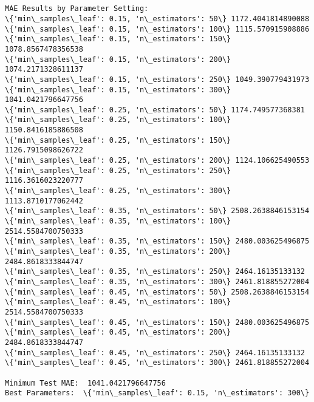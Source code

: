 \documentclass[11pt]{article}
\begin{document}
    \begin{center}
    \end{center}
    { \hspace*{\fill} \\}
    
    \begin{Verbatim}[commandchars=\\\{\}]

MAE Results by Parameter Setting:
\{'min\_samples\_leaf': 0.15, 'n\_estimators': 50\} 1172.4041814890088
\{'min\_samples\_leaf': 0.15, 'n\_estimators': 100\} 1115.570915908886
\{'min\_samples\_leaf': 0.15, 'n\_estimators': 150\} 1078.8567478356538
\{'min\_samples\_leaf': 0.15, 'n\_estimators': 200\} 1074.2171328611137
\{'min\_samples\_leaf': 0.15, 'n\_estimators': 250\} 1049.390779431973
\{'min\_samples\_leaf': 0.15, 'n\_estimators': 300\} 1041.0421796647756
\{'min\_samples\_leaf': 0.25, 'n\_estimators': 50\} 1174.749577368381
\{'min\_samples\_leaf': 0.25, 'n\_estimators': 100\} 1150.8416185886508
\{'min\_samples\_leaf': 0.25, 'n\_estimators': 150\} 1126.7915098626722
\{'min\_samples\_leaf': 0.25, 'n\_estimators': 200\} 1124.106625490553
\{'min\_samples\_leaf': 0.25, 'n\_estimators': 250\} 1116.3616023220777
\{'min\_samples\_leaf': 0.25, 'n\_estimators': 300\} 1113.8710177062442
\{'min\_samples\_leaf': 0.35, 'n\_estimators': 50\} 2508.2638846153154
\{'min\_samples\_leaf': 0.35, 'n\_estimators': 100\} 2514.5584700750333
\{'min\_samples\_leaf': 0.35, 'n\_estimators': 150\} 2480.003625496875
\{'min\_samples\_leaf': 0.35, 'n\_estimators': 200\} 2484.8618333844747
\{'min\_samples\_leaf': 0.35, 'n\_estimators': 250\} 2464.16135133132
\{'min\_samples\_leaf': 0.35, 'n\_estimators': 300\} 2461.818855272004
\{'min\_samples\_leaf': 0.45, 'n\_estimators': 50\} 2508.2638846153154
\{'min\_samples\_leaf': 0.45, 'n\_estimators': 100\} 2514.5584700750333
\{'min\_samples\_leaf': 0.45, 'n\_estimators': 150\} 2480.003625496875
\{'min\_samples\_leaf': 0.45, 'n\_estimators': 200\} 2484.8618333844747
\{'min\_samples\_leaf': 0.45, 'n\_estimators': 250\} 2464.16135133132
\{'min\_samples\_leaf': 0.45, 'n\_estimators': 300\} 2461.818855272004

Minimum Test MAE:  1041.0421796647756
Best Parameters:  \{'min\_samples\_leaf': 0.15, 'n\_estimators': 300\}
\end{Verbatim}

    \begin{center}
    \end{center}
    { \hspace*{\fill} \\}
    
\end{document}
